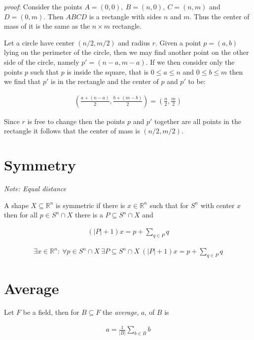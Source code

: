 \documentclass{article}
\begin{document}
\textit{proof}:
Consider the points $A = (0,0),\ B = (n,0),\ C = (n,m)$ and $D = (0,m)$. Then 
$ABCD$ is a rectangle with sides $n$ and $m$. Thus the center of mass of it
is the same as the $n \times m$ rectangle. 

Let a circle have center $(n/2,m/2)$ and radius $r$. Given a point 
$p=(a,b)$ lying on the perimeter of the circle, then we may find another point 
on the other side of the circle, namely $p'=(n-a,m-a)$. If we then consider only
the points $p$ such that $p$ is inside the square, that is $0 \leq a \leq n$ 
and $0 \leq b \leq m$ then we find that $p'$ is in the rectangle and the center
of $p$ and $p'$ to be:

\begin{align}
	\left( \frac{a+(n-a)}{2},\frac{b+(m-b)}{2} \right) =
	\left( \frac{n}{2},\frac{m}{2} \right) \nonumber
\end{align}

Since $r$ is free to change then the points $p$ and $p'$ together are all points 
in the rectangle it follows that the center of mass is $(n/2,m/2)$.

\section{Symmetry}
\textit{Note: Equal distance}

A shape $X \subseteq \mathbb{R}^n$ is symmetric if there is $x \in \mathbb{R}^n$ 
such that for $S^n$ with center $x$ then for all $p \in S^n \cap X$ there
is a $P \subseteq S^n \cap X$ and 

\begin{align}
	(|P|+1)x = p + \sum_{q \in P} q \nonumber
\end{align}

\begin{align}
	\exists x \in \mathbb{R}^n:\ \forall p \in S^n \cap X\ \exists P \subseteq 
	S^n \cap X\ (|P|+1)x = p + \sum_{q \in P} q \nonumber
\end{align}

\section{Average}
Let $F$ be a field, then for $B \subseteq F$ the
\textit{average}, $a$, of $B$ is

\begin{align}
	a = \frac{1}{|B|}\sum_{b \in B} b
\end{align}

\newpage
\end{document}
